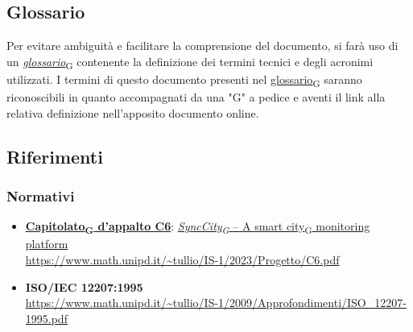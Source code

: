 \subsection{Glossario}
Per evitare ambiguità e facilitare la comprensione del documento, si farà uso di un \href{https://7last.github.io/docs/pb/documentazione-interna/glossario\#glossario}{\textit{glossario}\textsubscript{G}} contenente la definizione dei termini tecnici e degli acronimi utilizzati. I termini di questo documento presenti nel \href{https://7last.github.io/docs/pb/documentazione-interna/glossario\#glossario}{glossario\textsubscript{G}} saranno riconoscibili in quanto accompagnati da una "G" a pedice e aventi il link alla relativa definizione nell'apposito documento online.

\subsection{Riferimenti}
\subsubsection{Normativi}
\begin{itemize}
	\item \href{https://7last.github.io/docs/pb/documentazione-interna/glossario\#capitolato}{\textbf{Capitolato\textsubscript{G} d'appalto C6}}: \href{https://7last.github.io/docs/pb/documentazione-interna/glossario\#synccity}{\textit{SyncCity\textsubscript{G} } – A \href{https://7last.github.io/docs/pb/documentazione-interna/glossario\#smart-city}{smart city\textsubscript{G}} monitoring platform}\\
    \url{https://www.math.unipd.it/~tullio/IS-1/2023/Progetto/C6.pdf}
	\item \textbf{ISO/IEC 12207:1995} \\ \url{https://www.math.unipd.it/~tullio/IS-1/2009/Approfondimenti/ISO_12207-1995.pdf}
\end{itemize}

